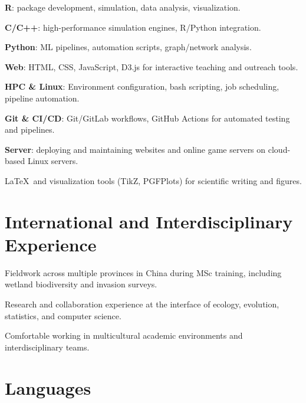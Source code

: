 \begin{expitem}
  \item \textbf{R}: package development, simulation, data analysis, visualization.
  \item \textbf{C/C++}: high-performance simulation engines, R/Python integration.
  \item \textbf{Python}: ML pipelines, automation scripts, graph/network analysis.
  \item \textbf{Web}: HTML, CSS, JavaScript, D3.js for interactive teaching and outreach tools.
  \item \textbf{HPC \& Linux}: Environment configuration, bash scripting, job scheduling, pipeline automation.
  \item \textbf{Git \& CI/CD}: Git/GitLab workflows, GitHub Actions for automated testing and pipelines.
  \item \textbf{Server}: deploying and maintaining websites and online game servers on cloud-based Linux servers.
  \item \LaTeX\ and visualization tools (TikZ, PGFPlots) for scientific writing and figures.
\end{expitem}

\section*{International and Interdisciplinary Experience}

\begin{expitem}
  \item Fieldwork across multiple provinces in China during MSc training, including wetland biodiversity and invasion surveys.
  \item Research and collaboration experience at the interface of ecology, evolution, statistics, and computer science.
  \item Comfortable working in multicultural academic environments and interdisciplinary teams.
\end{expitem}

\section*{Languages}

